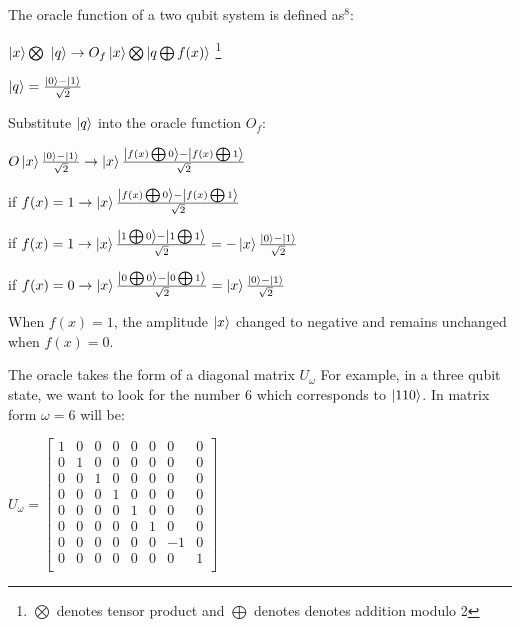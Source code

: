 \documentclass{article}
\begin{document}
The oracle function of a two qubit system is defined as\hyperlink{8}{$^8$}:
\vspace{5mm}

\qquad $\ket{x} \bigotimes\ \ket{q} \rightarrow{O_f} \ket{x} \bigotimes \ket{q \bigoplus f(x)}$ \footnote{$\bigotimes$ denotes tensor product and $\bigoplus$ denotes denotes addition modulo 2}
\vspace{5mm}

\qquad $\ket{q} = \frac{\ket{0} - \ket{1}}{\sqrt{2}}$
\vspace{5mm}

Substitute $\ket{q}$ into the oracle function $O_f$:
\vspace{5mm}

\qquad \qquad $ O\ket{x}\frac{\ket{0} - \ket{1}}{\sqrt{2}} \rightarrow \ket{x} \frac{\ket{f(x) \bigoplus 0} - \ket{f(x) \bigoplus 1}}{\sqrt{2}}$
\vspace{5mm}

\qquad if $ f(x) =1 \rightarrow \ket{x}\frac{\ket{f(x) \bigoplus0} - \ket{f(x) \bigoplus1}}{\sqrt{2}}$
\vspace{5mm}

\qquad if $f(x) =1 \rightarrow \ket{x}\frac{\ket{1 \bigoplus 0} - \ket{1 \bigoplus 1}}{\sqrt{2}} = -\ket{x}\frac{\ket{0} - \ket{1}}{\sqrt{2}}$
\vspace{5mm}

\noindent
\qquad if $f(x) =0 \rightarrow \ket{x}\frac{\ket{0 \bigoplus 0} - \ket{0 \bigoplus 1}}{\sqrt{2}} = \ket{x}\frac{\ket{0} - \ket{1}}{\sqrt{2}}$
\vspace{5mm}

\noindent
When $f(x) = 1 $, the amplitude $\ket{x}$ changed to negative and remains unchanged when $f(x) = 0$.
\pagebreak

\noindent
The oracle takes the form of a diagonal matrix $U_{\omega}$
\vspace{5mm}
\noindent
For example, in a three qubit state, we want to look for the number 6 which corresponds to $\ket{110}$. In matrix form $\omega =6$ will be:
\vspace{5mm}

\qquad $ U_\omega = \begin{bmatrix}

1 & 0 & 0 & 0 & 0& 0 & 0& 0 \\
0 & 1 & 0 & 0 & 0& 0 & 0& 0 \\
0 & 0 & 1 & 0 & 0& 0 & 0& 0 \\
0 & 0 & 0 & 1 & 0& 0 & 0& 0 \\
0 & 0 & 0 & 0 & 1& 0 & 0& 0 \\
0 & 0 & 0 & 0 & 0& 1 & 0& 0 \\
0 & 0 & 0 & 0 & 0& 0 & -1& 0 \\
0 & 0 & 0 & 0 & 0& 0 & 0& 1 \\

\end{bmatrix}$
\vspace{5mm}
\end{document}
